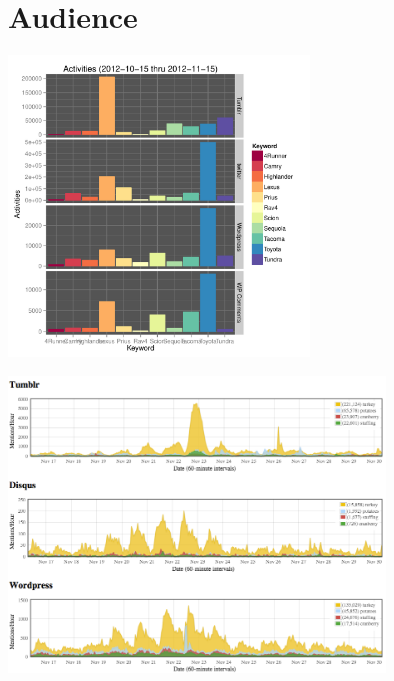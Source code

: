 \documentclass{beamer}
\begin{document}

\section{Audience}
{
\begin{frame}
\textcolor{black} {
\hfill \Huge \insertsection}
\end{frame}
}

\begin{frame}
  \begin{center}
    \includegraphics[width=8cm]{./imgs/TOY_bars.pdf}
  \end{center}
\end{frame}

\begin{frame}
  \begin{center}
    \includegraphics[width=10cm]{./imgs/t-day2012.png}
  \end{center}
\end{frame}
\end{document}
